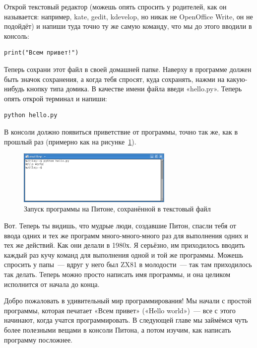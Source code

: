\begin{LINUX}
Открой текстовый редактор (можешь опять спросить у родителей, как он называется: например, kate, gedit, kdevelop, но никак не OpenOffice Write, он не подойдёт) и напиши туда точно ту же самую команду, что мы до этого вводили в консоль:

\begin{verbatim}
print("Всем привет!")
\end{verbatim}

Теперь сохрани этот файл в своей домашней папке. Наверху в программе должен быть значок сохранения, а когда тебя спросят, куда сохранять, нажми на какую-нибудь кнопку типа домика. В качестве имени файла введи «hello.py». Теперь опять открой терминал и напиши:

\begin{verbatim}
python hello.py
\end{verbatim}

В консоли должно появиться приветствие от программы, точно так же, как в прошлый раз (примерно как на рисунке \ref{fig9}).

\begin{figure}
\begin{center}
\includegraphics[width=75mm]{../en/figure9.eps}
\end{center}
\caption{Запуск программы на Питоне, сохранённой в текстовый файл}\label{fig9}
\end{figure}
\end{LINUX}

Вот. Теперь ты видишь, что мудрые люди, создавшие Питон, спасли тебя от ввода одних и тех же программ много-много-много раз для выполнения одних и тех же действий. Как они делали в 1980х. Я серьёзно, им приходилось вводить каждый раз кучу команд для выполнения одной и той же программы. Можешь спросить у папы — вдруг у него был ZX81 в молодости — так там приходилось так делать. Теперь можно просто написать имя программы, и она целиком исполнится от начала до конца.


Добро пожаловать в удивительный мир программирования!
Мы начали с простой программы, которая печатает «Всем привет» («Hello world») — все с этого начинают, когда учатся программировать. В следующей главе мы займёмся чуть более полезными вещами в консоли Питона, а потом изучим, как написать программу посложнее.
